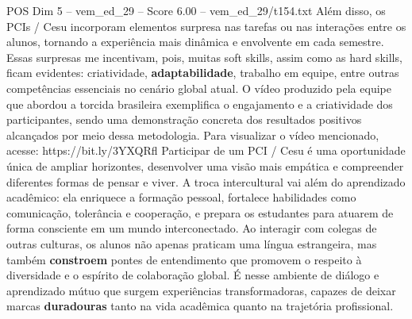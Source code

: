 \begin{textsample}{POS Dim 5 – vem\_ed\_29 – Score 6.00 – vem\_ed\_29/t154.txt}
Além disso, os PCIs / Cesu incorporam elementos surpresa nas tarefas ou nas interações entre os alunos, tornando a experiência mais dinâmica e envolvente em cada semestre.
Essas surpresas me incentivam, pois, muitas soft skills, assim como as hard skills, ficam evidentes: criatividade, \textbf{adaptabilidade}, trabalho em equipe, entre outras competências essenciais no cenário global atual.
O vídeo produzido pela equipe que abordou a torcida brasileira exemplifica o engajamento e a criatividade dos participantes, sendo uma demonstração concreta dos resultados positivos alcançados por meio dessa metodologia.
Para visualizar o vídeo mencionado, acesse: https://bit.ly/3YXQRfl Participar de um PCI / Cesu é uma oportunidade única de ampliar horizontes, desenvolver uma visão mais empática e compreender diferentes formas de pensar e viver.
A troca intercultural vai além do aprendizado acadêmico: ela enriquece a formação pessoal, fortalece habilidades como comunicação, tolerância e cooperação, e prepara os estudantes para atuarem de forma consciente em um mundo interconectado.
Ao interagir com colegas de outras culturas, os alunos não apenas praticam uma língua estrangeira, mas também \textbf{constroem} pontes de entendimento que promovem o respeito à diversidade e o espírito de colaboração global.
É nesse ambiente de diálogo e aprendizado mútuo que surgem experiências transformadoras, capazes de deixar marcas \textbf{duradouras} tanto na vida acadêmica quanto na trajetória profissional.

\end{textsample}
